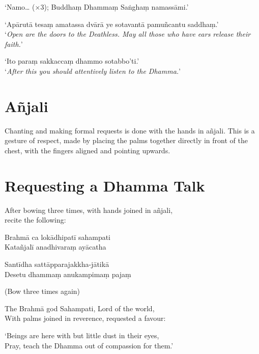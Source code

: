 ‘Namo… (×3); Buddhaṃ Dhammaṃ Saṅghaṃ namassāmi.’


‘Apārutā tesaṃ amatassa dvārā ye sotavantā pamuñcantu saddhaṃ.’\\
‘\emph{Open are the doors to the Deathless. May all those who have ears release their faith.}’

‘Ito paraṃ sakkaccaṃ dhammo sotabbo'ti.’\\
‘\emph{After this you should attentively listen to the Dhamma.}’

\section{Añjali}

Chanting and making formal requests is done with the hands in añjali.
This is a gesture of respect, made by placing the palms together
directly in front of the chest, with the fingers aligned and pointing
upwards.

\section{Requesting a Dhamma Talk}

\ifhandbookedition
\enlargethispage{\baselineskip}
\fi

\vspace*{-0.2\baselineskip}

\begin{instruction}
  After bowing three times, with hands joined in añjali,\\
  recite the following:
\end{instruction}

\vspace*{\parskip}

\begin{paritta}
Brahmā ca lokādhipatī sahampati\\
Katañjalī anadhivaraṃ ayācatha

Santīdha sattāpparajakkha-jātikā\\
Desetu dhammaṃ anukampimaṃ pajaṃ
\end{paritta}

\begin{instruction}
  (Bow three times again)
\end{instruction}

\begin{english}
The Brahmā god Sahampati, Lord of the world,\\
With palms joined in reverence, requested a favour:

`Beings are here with but little dust in their eyes,\\
Pray, teach the Dhamma out of compassion for them.'
\end{english}

